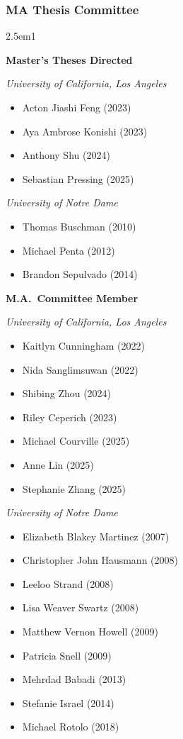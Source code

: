 \documentclass[
]{article}
\providecommand{\tightlist}{%
  \setlength{\itemsep}{0pt}\setlength{\parskip}{0pt}}
\newenvironment{cventry}{\begin{hangparas}{2.5em}{1}}{\end{hangparas}}
\begin{document}
\subsubsection{MA Thesis Committee}\label{ma-thesis-committee}

\begin{cventry}

\textbf{Master's Theses Directed}

\emph{University of California, Los Angeles}

\begin{itemize}
\tightlist
\item
  Acton Jiashi Feng (2023)
\item
  Aya Ambrose Konishi (2023)
\item
  Anthony Shu (2024)
\item
  Sebastian Pressing (2025)
\end{itemize}

\emph{University of Notre Dame}

\begin{itemize}
\tightlist
\item
  Thomas Buschman (2010)
\item
  Michael Penta (2012)
\item
  Brandon Sepulvado (2014)
\end{itemize}

\textbf{M.A.~Committee Member}

\emph{University of California, Los Angeles}

\begin{itemize}
\tightlist
\item
  Kaitlyn Cunningham (2022)
\item
  Nida Sanglimsuwan (2022)
\item
  Shibing Zhou (2024)
\item
  Riley Ceperich (2023)
\item
  Michael Courville (2025)
\item
  Anne Lin (2025)
\item
  Stephanie Zhang (2025)
\end{itemize}

\emph{University of Notre Dame}

\begin{itemize}
\tightlist
\item
  Elizabeth Blakey Martinez (2007)
\item
  Christopher John Hausmann (2008)
\item
  Leeloo Strand (2008)
\item
  Lisa Weaver Swartz (2008)
\item
  Matthew Vernon Howell (2009)
\item
  Patricia Snell (2009)
\item
  Mehrdad Babadi (2013)
\item
  Stefanie Israel (2014)
\item
  Michael Rotolo (2018)
\end{itemize}

\end{cventry}
\end{document}
